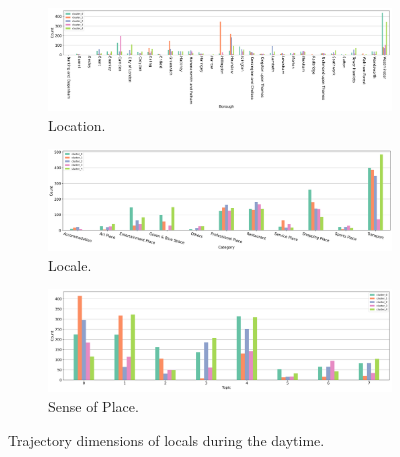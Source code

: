 \documentclass{article}
\theoremstyle{definition}
\theoremstyle{remark}
\begin{document}
\begin{figure}[!h]

\centering
\begin{subfigure}{0.6\textheight}
\centering
\includegraphics[width=1\linewidth]{figures/traj_location_daytime_locals.png}
\caption{Location.}
\label{fig:traj_location_daytime_locals}
\end{subfigure}
\begin{subfigure}{0.6\textheight}
\centering
\includegraphics[width=1\linewidth]{figures/traj_locale_daytime_locals.png}
\caption{Locale.}
\label{fig:traj_locale_daytime_locals}
\end{subfigure}
\begin{subfigure}{0.6\textheight}
\centering
\includegraphics[width=1\linewidth]{figures/traj_sense_daytime_locals.png}
\caption{Sense of Place.}
\label{fig:traj_sense_daytime_locals}
\end{subfigure}

\caption{Trajectory dimensions of locals during the daytime.}
\label{fig:traj_dimension_daytime_locas}
\end{figure}
\end{document}
